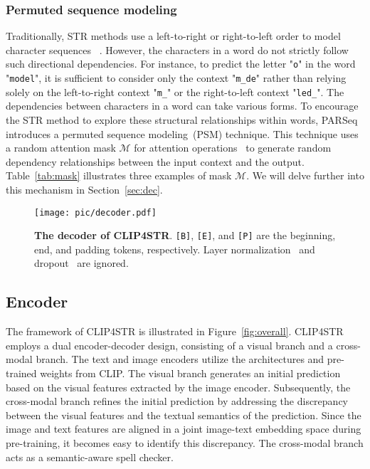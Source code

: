 \documentclass[lettersize,journal]{IEEEtran}
\begin{document}
\subsubsection{Permuted sequence modeling} \label{sec-psm}
Traditionally, STR methods use a left-to-right or right-to-left order to model character sequences ~\cite{2021_abinet}. 
However, the characters in a word do not strictly follow such directional dependencies.
For instance, to predict the letter "\texttt{o}" in the word "\texttt{model}", it is sufficient to consider only the context "\texttt{m\_de}" rather than relying solely on the left-to-right context "\texttt{m\_}" or the right-to-left context "\texttt{led\_}". 
The dependencies between characters in a word can take various forms.
To encourage the STR method to explore these structural relationships within words, PARSeq~\cite{2022_parseq} introduces a permuted sequence modeling~(PSM) technique.
This technique uses a random attention mask $\mathcal{M}$ for attention operations~\cite{2017_attention} to generate random dependency relationships between the input context and the output. 
Table~\ref{tab:mask} illustrates three examples of mask $\mathcal{M}$.
We will delve further into this mechanism in Section~\ref{sec:dec}.

\begin{figure*}[!t]
	\centering
	\texttt{[image: pic/decoder.pdf]}
	\caption{\textbf{The decoder of CLIP4STR}. \texttt{[B]}, \texttt{[E]}, and \texttt{[P]} are the beginning, end, and padding tokens, respectively.
 Layer normalization~\cite{2016_ln}
 and dropout~\cite{2014_dropout} are ignored.}
	\label{fig:decoder}
\end{figure*}


\subsection{Encoder}
The framework of CLIP4STR is illustrated in Figure~\ref{fig:overall}.
CLIP4STR employs a dual encoder-decoder design, consisting of a visual branch and a cross-modal branch.
The text and image encoders utilize the architectures and pre-trained weights from CLIP.
The visual branch generates an initial prediction based on the visual features extracted by the image encoder.
Subsequently, the cross-modal branch refines the initial prediction by addressing the discrepancy between the visual features and the textual semantics of the prediction.
Since the image and text features are aligned in a joint image-text embedding space during pre-training, it becomes easy to identify this discrepancy.
The cross-modal branch acts as a semantic-aware spell checker.
\end{document}
